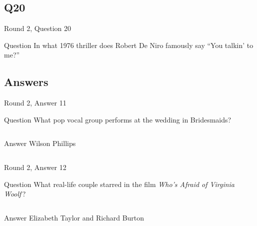 \documentclass[11pt]{beamer}
\begin{document}
\subsection*{Q20}
\begin{frame}[t]{Round 2, Question 20}
\vspace{2em}
\begin{block}{Question}
In what 1976 thriller does Robert De Niro famously say ``You talkin' to me?''
\end{block}
\end{frame}
    
\subsection{Answers}

\begin{frame}[t]{Round 2, Answer 11}
\vspace{2em}
\begin{block}{Question}
What pop vocal group performs at the wedding in Bridesmaids?
\end{block}
\pause{}
\begin{columns}[T,totalwidth=\linewidth]
\begin{column}{0.35\linewidth}
\begin{block}{Answer}
Wilson Phillips
\end{block}
\end{column}
\begin{column}{0.6\linewidth}
\begin{center}
\texttt{[image: \{Images/wilsonphillips]}.jpg}
\end{center}
\end{column}
\end{columns}
\end{frame}
    

\begin{frame}[t]{Round 2, Answer 12}
\vspace{2em}
\begin{block}{Question}
What real-life couple starred in the film \emph{Who's Afraid of Virginia Woolf}\,?
\end{block}
\pause{}
\begin{columns}[T,totalwidth=\linewidth]
\begin{column}{0.35\linewidth}
\begin{block}{Answer}
Elizabeth Taylor and Richard Burton
\end{block}
\end{column}
\begin{column}{0.6\linewidth}
\begin{center}
\texttt{[image: \{Images/woolf]}.jpg}
\end{center}
\end{column}
\end{columns}
\end{frame}
    
\end{document}
